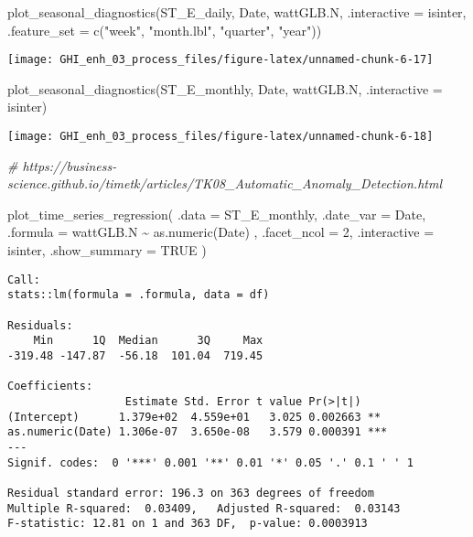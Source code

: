 \documentclass[
  10pt,
  a4paper,oneside]{article}
\newenvironment{Shaded}{\begin{snugshade}}{\end{snugshade}}
\newcommand{\AttributeTok}[1]{\textcolor[rgb]{0.77,0.63,0.00}{#1}}
\newcommand{\CommentTok}[1]{\textcolor[rgb]{0.56,0.35,0.01}{\textit{#1}}}
\newcommand{\ConstantTok}[1]{\textcolor[rgb]{0.00,0.00,0.00}{#1}}
\newcommand{\DecValTok}[1]{\textcolor[rgb]{0.00,0.00,0.81}{#1}}
\newcommand{\FunctionTok}[1]{\textcolor[rgb]{0.00,0.00,0.00}{#1}}
\newcommand{\NormalTok}[1]{#1}
\newcommand{\SpecialCharTok}[1]{\textcolor[rgb]{0.00,0.00,0.00}{#1}}
\newcommand{\StringTok}[1]{\textcolor[rgb]{0.31,0.60,0.02}{#1}}
\begin{document}
\begin{Shaded}
\begin{Highlighting}[]
\FunctionTok{plot\_seasonal\_diagnostics}\NormalTok{(ST\_E\_daily, Date, wattGLB.N, }\AttributeTok{.interactive =}\NormalTok{ isinter,}
                          \AttributeTok{.feature\_set =} \FunctionTok{c}\NormalTok{(}\StringTok{"week"}\NormalTok{, }\StringTok{"month.lbl"}\NormalTok{, }\StringTok{"quarter"}\NormalTok{, }\StringTok{"year"}\NormalTok{))}
\end{Highlighting}
\end{Shaded}

\begin{center}\texttt{[image: GHI\_enh\_03\_process\_files/figure-latex/unnamed-chunk-6-17]} \end{center}

\begin{Shaded}
\begin{Highlighting}[]
\FunctionTok{plot\_seasonal\_diagnostics}\NormalTok{(ST\_E\_monthly, Date, wattGLB.N, }\AttributeTok{.interactive =}\NormalTok{ isinter)}
\end{Highlighting}
\end{Shaded}

\begin{center}\texttt{[image: GHI\_enh\_03\_process\_files/figure-latex/unnamed-chunk-6-18]} \end{center}

\begin{Shaded}
\begin{Highlighting}[]
\CommentTok{\# https://business{-}science.github.io/timetk/articles/TK08\_Automatic\_Anomaly\_Detection.html}

\FunctionTok{plot\_time\_series\_regression}\NormalTok{(}
    \AttributeTok{.data         =}\NormalTok{ ST\_E\_monthly,}
    \AttributeTok{.date\_var     =}\NormalTok{ Date,}
    \AttributeTok{.formula      =}\NormalTok{ wattGLB.N }\SpecialCharTok{\textasciitilde{}} \FunctionTok{as.numeric}\NormalTok{(Date)  ,}
    \AttributeTok{.facet\_ncol   =} \DecValTok{2}\NormalTok{,}
    \AttributeTok{.interactive  =}\NormalTok{ isinter,}
    \AttributeTok{.show\_summary =} \ConstantTok{TRUE}
\NormalTok{)}
\end{Highlighting}
\end{Shaded}

\begin{verbatim}
Call:
stats::lm(formula = .formula, data = df)

Residuals:
    Min      1Q  Median      3Q     Max 
-319.48 -147.87  -56.18  101.04  719.45 

Coefficients:
                  Estimate Std. Error t value Pr(>|t|)    
(Intercept)      1.379e+02  4.559e+01   3.025 0.002663 ** 
as.numeric(Date) 1.306e-07  3.650e-08   3.579 0.000391 ***
---
Signif. codes:  0 '***' 0.001 '**' 0.01 '*' 0.05 '.' 0.1 ' ' 1

Residual standard error: 196.3 on 363 degrees of freedom
Multiple R-squared:  0.03409,   Adjusted R-squared:  0.03143 
F-statistic: 12.81 on 1 and 363 DF,  p-value: 0.0003913
\end{verbatim}
\end{document}
